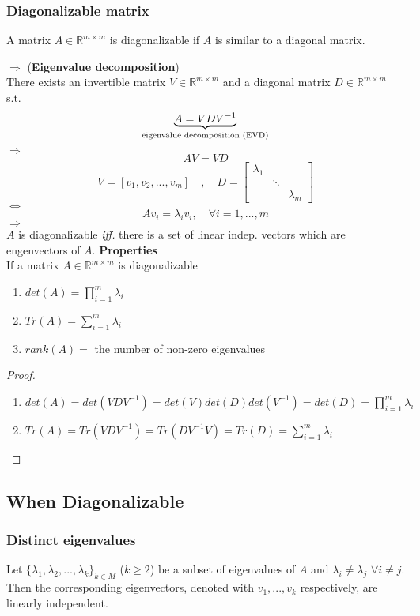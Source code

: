 \begin{multicols}{2}
\subsubsection{Diagonalizable matrix}
\begin{definition}[Diagonalizable]
    A matrix $A\in\mathbb{R}^{m\times m}$ is diagonalizable if $A$ is similar to a diagonal matrix. \\
\end{definition}
$\Longrightarrow$ (\textbf{Eigenvalue decomposition}) \\
There exists an invertible matrix $V\in\mathbb{R}^{m \times m}$ and a diagonal matrix $D\in \mathbb{R}^{m \times m}$ s.t.
\[
    \underbrace{A = VDV^{-1}}_{\text{\rm eigenvalue decomposition (EVD)}}
\]
$\Longrightarrow$
\[
    AV=VD
\]
\[V = [v_1,v_2,...,v_m]\quad , \quad D = \left[\begin{array}{ccc}
    \lambda_1 && \\
    & \ddots & \\
    && \lambda_m
\end{array}\right]\]
$\Longleftrightarrow$ \\
\[
    Av_i = \lambda_i v_i ,\quad \forall i=1,...,m
\]
$\Longrightarrow$ \\
$A$ is diagonalizable \emph{iff.} there is a set of linear indep. vectors which are engenvectors of $A$.
\textbf{Properties} \\
If a matrix $A\in\mathbb{R}^{m\times m}$ is diagonalizable
\begin{enumerate}
    \item $det(A)=\prod_{i=1}^m \lambda_i$
    \item $Tr(A)=\sum_{i=1}^m \lambda_i$
    \item $rank(A)=$ the number of non-zero eigenvalues
\end{enumerate}
\begin{proof} 
    \begin{enumerate}
        \item $det(A)=det(VDV^{-1})=det(V)det(D)det(V^{-1})=det(D)=\prod_{i=1}^m\lambda_i$
        \item $Tr(A)=Tr(VDV^{-1})=Tr(DV^{-1}V)=Tr(D)=\sum_{i=1}^m\lambda_i$
    \end{enumerate}
\end{proof}
\subsection{When Diagonalizable}
\subsubsection{Distinct eigenvalues}
Let $\{\lambda_1,\lambda_2,...,\lambda_k\}_{k\in M}$ ($k\geq 2$) be a subset of eigenvalues of $A$ and $\lambda_i\neq \lambda_j$ $\forall i\neq j$. 
Then the corresponding eigenvectors, denoted with $v_1,...,v_k$ respectively, are linearly independent. 


\end{multicols}
